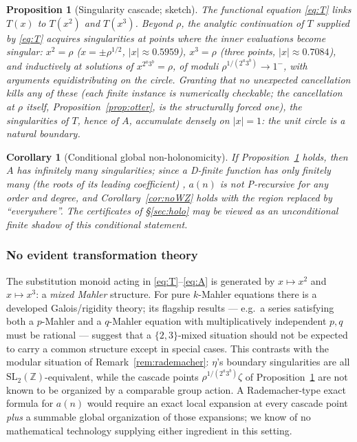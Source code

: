 \documentclass[11pt]{article}
\newtheorem{proposition}[theorem]{Proposition}
\newtheorem{corollary}[theorem]{Corollary}
\theoremstyle{definition}
\newcommand{\ZZ}{\mathbb{Z}}
\begin{document}
\begin{proposition}[Singularity cascade; sketch]\label{prop:cascade}
The functional equation \eqref{eq:T} links $T(x)$ to $T(x^2)$ and $T(x^3)$.
Beyond $\rho$, the analytic continuation of $T$ supplied by \eqref{eq:T}
acquires singularities at points where the \emph{inner} evaluations become
singular: $x^2=\rho$ ($x=\pm\rho^{1/2}$, $|x|\approx0.5959$), $x^3=\rho$ (three
points, $|x|\approx0.7084$), and inductively at solutions of
$x^{2^a3^b}=\rho$, of moduli $\rho^{1/(2^a3^b)}\to1^-$, with arguments
equidistributing on the circle. Granting that no unexpected cancellation kills
any of these (each finite instance is numerically checkable; the cancellation at
$\rho$ itself, Proposition~\ref{prop:otter}, is the structurally forced one),
the singularities of $T$, hence of $A$, accumulate densely on $|x|=1$:
the unit circle is a natural boundary.
\end{proposition}

\begin{corollary}[Conditional global non-holonomicity]\label{cor:conditional}
If Proposition~\ref{prop:cascade} holds, then $A$ has infinitely many
singularities; since a D-finite function has only finitely many (the roots of
its leading coefficient) \cite{Stanley1980}, $a(n)$ is not P-recursive for
\emph{any} order and degree, and Corollary~\ref{cor:noWZ} holds with the region
replaced by ``everywhere''. The certificates of \S\ref{sec:holo} may be viewed
as an unconditional finite shadow of this conditional statement.
\end{corollary}

\subsubsection{No evident transformation theory}

The substitution monoid acting in \eqref{eq:T}--\eqref{eq:A} is generated by
$x\mapsto x^2$ and $x\mapsto x^3$: a \emph{mixed Mahler} structure. For pure
$k$-Mahler equations there is a developed Galois/rigidity theory; its flagship
results --- e.g.\ a series satisfying both a $p$-Mahler and a $q$-Mahler
equation with multiplicatively independent $p,q$ must be rational
\cite{AdamczewskiBell2017,SchafkeSinger2019} --- suggest that a
$\{2,3\}$-mixed situation should not be expected to carry a common structure
except in special cases. This contrasts with the modular situation of
Remark~\ref{rem:rademacher}: $\eta$'s boundary singularities are all
$\mathrm{SL}_2(\ZZ)$-equivalent, while the cascade points
$\rho^{1/(2^a3^b)}\zeta$ of Proposition~\ref{prop:cascade} are not known to be
organized by a comparable group action. A Rademacher-type exact formula for
$a(n)$ would require an exact local expansion at every cascade point \emph{plus}
a summable global organization of those expansions; we know of no mathematical
technology supplying either ingredient in this setting.
\end{document}
